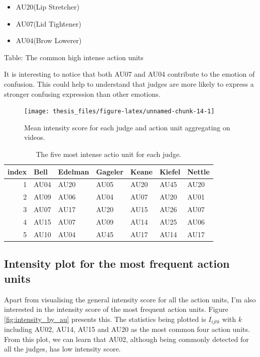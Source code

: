 \documentclass{monashthesis}
\begin{document}
\begin{itemize}
\tightlist
\item
  AU20(Lip Stretcher)
\item
  AU07(Lid Tightener)
\item
  AU04(Brow Lowerer)
\end{itemize}

Table: The common high intense action units

It is interesting to notice that both AU07 and AU04 contribute to the emotion of confusion. This could help to understand that judges are more likely to express a stronger confusing expression than other emotions.

\begin{figure}
\texttt{[image: thesis\_files/figure-latex/unnamed-chunk-14-1]} \caption{Mean intensity score for each judge and action unit aggregating on videos.\label{fig:mean_intensity}}\label{fig:unnamed-chunk-14}
\end{figure}

\begin{table}[t]

\caption{\label{tab:unnamed-chunk-15}\label{tab:most_intense}The five most intense actio unit for each judge.}
\centering
\begin{tabular}{r|l|l|l|l|l|l}
\hline
index & Bell & Edelman & Gageler & Keane & Kiefel & Nettle\\
\hline
1 & AU04 & AU20 & AU05 & AU20 & AU45 & AU20\\
\hline
2 & AU09 & AU06 & AU04 & AU07 & AU20 & AU01\\
\hline
3 & AU07 & AU17 & AU20 & AU15 & AU26 & AU07\\
\hline
4 & AU15 & AU07 & AU09 & AU14 & AU25 & AU06\\
\hline
5 & AU10 & AU04 & AU45 & AU17 & AU14 & AU17\\
\hline
\end{tabular}
\end{table}

\hypertarget{intensity-plot-for-the-most-frequent-action-units}{%
\subsection{Intensity plot for the most frequent action units}\label{intensity-plot-for-the-most-frequent-action-units}}

Apart from visualising the general intensity score for all the action units, I'm also interested in the intensity score of the most frequent action units. Figure \ref{fig:intensity_by_au} presents this. The statistics being plotted is \(I_{ijtk}\) with \(k\) including AU02, AU14, AU15 and AU20 as the most common four action units. From this plot, we can learn that AU02, although being commonly detected for all the judges, has low intensity score.
\end{document}
